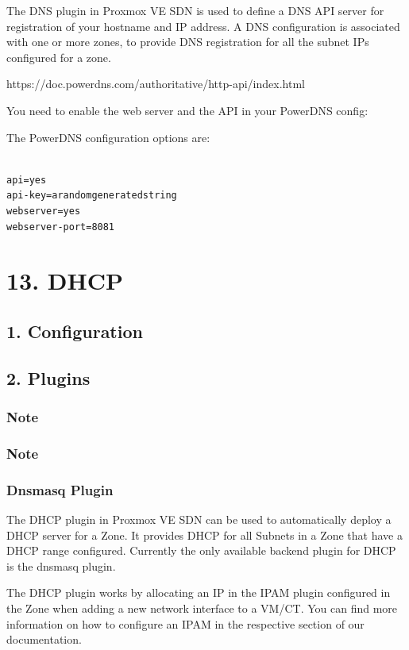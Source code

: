 The DNS plugin in Proxmox VE SDN is used to define a DNS API server for registration of your hostname and IP address. A DNS configuration is associated with one or more zones, to provide DNS registration for all the subnet IPs configured for a zone.

https://doc.powerdns.com/authoritative/http-api/index.html

You need to enable the web server and the API in your PowerDNS config:

The PowerDNS configuration options are:

\begin{lstlisting}

api=yes
api-key=arandomgeneratedstring
webserver=yes
webserver-port=8081

\end{lstlisting}


\section{13. DHCP}

\subsection{1. Configuration}

\subsection{2. Plugins}

\subsubsection{Note}

\subsubsection{Note}

\subsubsection{Dnsmasq Plugin}

The DHCP plugin in Proxmox VE SDN can be used to automatically deploy a DHCP server for a Zone. It provides DHCP for all Subnets in a Zone that have a DHCP range configured. Currently the only available backend plugin for DHCP is the dnsmasq plugin.

The DHCP plugin works by allocating an IP in the IPAM plugin configured in the Zone when adding a new network interface to a VM/CT. You can find more information on how to configure an IPAM in the respective section of our documentation.

